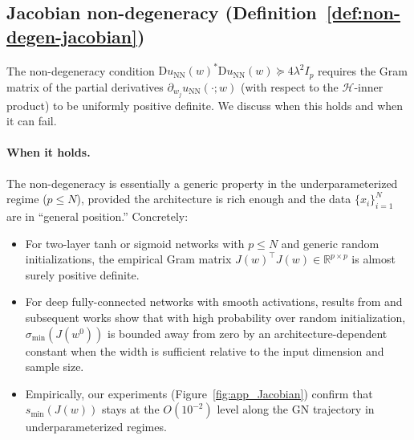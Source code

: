\documentclass[twoside,11pt]{article}
\newcommand{\R}{\mathbb{R}}
\newcommand{\D}{\mathrm{D}}
\newcommand{\NN}{\mathrm{NN}}
\newcommand{\calH}{\mathcal{H}}
\begin{document}
\subsection{Jacobian non-degeneracy (Definition~\ref{def:non-degen-jacobian})}\label{app:disc-nondegen}

The non-degeneracy condition $\D u_\NN(w)^*\D u_\NN(w)\succeq 4\lambda^2 I_p$ requires the
Gram matrix of the partial derivatives $\partial_{w_j} u_\NN(\cdot;w)$ (with respect to the
$\calH$-inner product) to be uniformly positive definite. We discuss when this holds and
when it can fail.

\paragraph{When it holds.}
The non-degeneracy is essentially a generic property in the underparameterized regime
($p\le N$), provided the architecture is rich enough and the data $\{x_i\}_{i=1}^N$ are in
``general position.'' Concretely:
\begin{itemize}
\item For two-layer tanh or sigmoid networks with $p\le N$ and generic random initializations,
the empirical Gram matrix $J(w)^\top J(w)\in\R^{p\times p}$ is almost surely positive definite.
\item For deep fully-connected networks with smooth activations, results from
\citet{du2018gradient} and subsequent works show that with high probability over random
initialization, $\sigma_{\min}(J(w^0))$ is bounded away from zero by an architecture-dependent
constant when the width is sufficient relative to the input dimension and sample size.
\item Empirically, our experiments (Figure~\ref{fig:app_Jacobian}) confirm that
$s_{\min}(J(w))$ stays at the $O(10^{-2})$ level along the GN trajectory in
underparameterized regimes.
\end{itemize}
\end{document}

